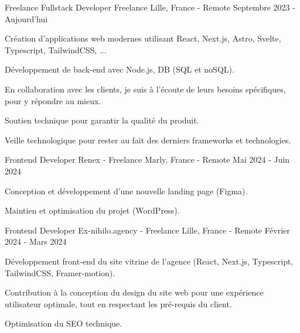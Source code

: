 
\begin{cventries}  \cventry
    {Freelance Fullstack Developer} %
    {Freelance} %
    {Lille, France - Remote} %
    {Septembre 2023 - Aujourd'hui} %
    {
      \begin{cvitems} %
        \item {Création d'applications web modernes utilisant React, Next.js, Astro, Svelte, Typescript, TailwindCSS, ...}
        \item {Développement de back-end avec Node.js, DB (SQL et noSQL).}
        \item {En collaboration avec les clients, je suis à l'écoute de leurs besoins spécifiques, pour y répondre au mieux.}
        \item {Soutien technique pour garantir la qualité du produit.}
        \item {Veille technologique pour rester au fait des derniers frameworks et technologies.}
      \end{cvitems}
    }

  \cventry
    {Frontend Developer} %
    {Renex - Freelance} %
    {Marly, France - Remote} %
    {Mai 2024 - Juin 2024} %
    {
      \begin{cvitems} %
        \item {Conception et développement d'une nouvelle landing page (Figma).}
        \item {Maintien et optimisation du projet (WordPress).}
      \end{cvitems}
    }  

  \cventry
    {Frontend Developer} %
    {Ex-nihilo.agency - Freelance} %
    {Lille, France - Remote} %
    {Février 2024 - Mars 2024} %
    {
      \begin{cvitems} %
        \item {Développement front-end du site vitrine de l'agence (React, Next.js, Typescript, TailwindCSS, Framer-motion).}
        \item {Contribution à la conception du design du site web pour une expérience utilisateur optimale, tout en respectant les pré-requis du client.}
        \item {Optimisation du SEO technique.}
      \end{cvitems}
    }


\end{cventries}
